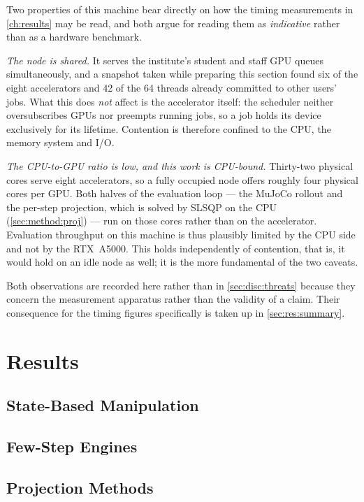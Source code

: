 \documentclass[headsepline,footsepline,footinclude=false,oneside,fontsize=11pt,paper=a4,listof=totoc,bibliography=totoc]{scrbook}
\theoremstyle{definition}
\theoremstyle{plain}
\theoremstyle{remark}
\begin{document}
Two properties of this machine bear directly on how the timing measurements in
\autoref{ch:results} may be read, and both argue for reading them as \emph{indicative} rather than as
a hardware benchmark.

\emph{The node is shared.} It serves the institute's student and staff GPU queues simultaneously,
and a snapshot taken while preparing this section found six of the eight accelerators and 42 of the
64 threads already committed to other users' jobs. What this does \emph{not} affect is the
accelerator itself: the scheduler neither oversubscribes GPUs nor preempts running jobs, so a job
holds its device exclusively for its lifetime. Contention is therefore confined to the CPU, the
memory system and I/O.

\emph{The CPU-to-GPU ratio is low, and this work is CPU-bound.} Thirty-two physical cores serve
eight accelerators, so a fully occupied node offers roughly four physical cores per GPU. Both halves
of the evaluation loop --- the MuJoCo rollout and the per-step projection, which is solved by SLSQP
on the CPU (\autoref{sec:method:proj}) --- run on those cores rather than on the accelerator.
Evaluation throughput on this machine is thus plausibly limited by the CPU side and not by the
RTX~A5000. This holds independently of contention, that is, it would hold on an idle node as well;
it is the more fundamental of the two caveats.

Both observations are recorded here rather than in \autoref{sec:disc:threats} because they concern
the measurement apparatus rather than the validity of a claim. Their consequence for the timing
figures specifically is taken up in \autoref{sec:res:summary}.

\chapter{Results}\label{ch:results}
\section{State-Based Manipulation}\label{sec:res:state}
\section{Few-Step Engines}\label{sec:res:fewstep}
\section{Projection Methods}\label{sec:res:constraints}
\end{document}

